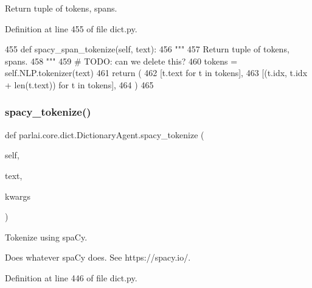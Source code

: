 \begin{DoxyVerb}Return tuple of tokens, spans.
\end{DoxyVerb}
 

Definition at line 455 of file dict.\+py.


\begin{DoxyCode}
455     \textcolor{keyword}{def }spacy\_span\_tokenize(self, text):
456         \textcolor{stringliteral}{"""}
457 \textcolor{stringliteral}{        Return tuple of tokens, spans.}
458 \textcolor{stringliteral}{        """}
459         \textcolor{comment}{# TODO: can we delete this?}
460         tokens = self.NLP.tokenizer(text)
461         \textcolor{keywordflow}{return} (
462             [t.text \textcolor{keywordflow}{for} t \textcolor{keywordflow}{in} tokens],
463             [(t.idx, t.idx + len(t.text)) \textcolor{keywordflow}{for} t \textcolor{keywordflow}{in} tokens],
464         )
465 
\end{DoxyCode}
\mbox{\label{classparlai_1_1core_1_1dict_1_1DictionaryAgent_a8e818ad5e11ecb08de6c4b858b2e68f1}} 
\subsubsection{\texorpdfstring{spacy\+\_\+tokenize()}{spacy\_tokenize()}}
{\footnotesize\ttfamily def parlai.\+core.\+dict.\+Dictionary\+Agent.\+spacy\+\_\+tokenize (\begin{DoxyParamCaption}\item[{}]{self,  }\item[{}]{text,  }\item[{}]{kwargs }\end{DoxyParamCaption})}

\begin{DoxyVerb}Tokenize using spaCy.

Does whatever spaCy does. See https://spacy.io/.
\end{DoxyVerb}
 

Definition at line 446 of file dict.\+py.


